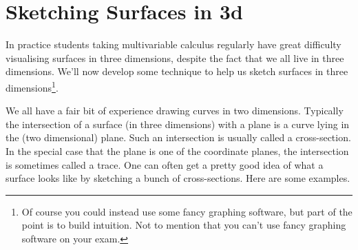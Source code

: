\goodbreak

\section{Sketching Surfaces in 3d}\label{sec sketching}

In practice students taking multivariable calculus regularly have great
difficulty visualising surfaces in three dimensions, despite the fact
that we all live in three dimensions. We'll now develop some
technique to help us sketch surfaces in three dimensions\footnote{Of course you could instead use some fancy graphing software, but part of the point is to
build intuition. Not to mention that you can't use fancy graphing software on 
your exam.}.

We all have a fair
bit of experience drawing curves in two dimensions. Typically the intersection
of a surface (in three dimensions) with a plane is a curve lying in 
the (two dimensional) plane. Such an intersection is usually called a cross-section.
In the special case that the plane is one of the coordinate planes, the
intersection is sometimes called a trace. One can often get a pretty good
idea of what a surface looks like by sketching a bunch of cross-sections.
Here are some examples.

